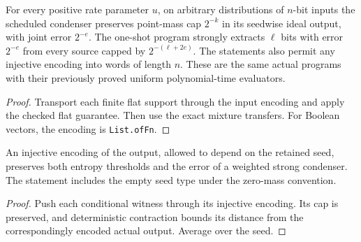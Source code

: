 \begin{theorem}
  \label{thm:lowerbounds-algebraic-weighted-programs}
  \leanok
  For every positive rate parameter $u$, on arbitrary distributions of
  $n$-bit inputs the scheduled condenser
  preserves point-mass cap $2^{-k}$ in its seedwise ideal output, with
  joint error $2^{-e}$. The one-shot program strongly extracts $\ell$ bits
  with error $2^{-e}$ from every source capped by $2^{-(\ell+2e)}$.
  The statements also permit any injective encoding into words of length
  $n$. These are the same actual programs with their previously proved
  uniform polynomial-time evaluators.
\end{theorem}
\begin{proof}
  \leanok
  Transport each finite flat support through the input encoding and apply
  the checked flat guarantee. Then use the exact mixture transfers. For
  Boolean vectors, the encoding is \texttt{List.ofFn}.
\end{proof}

\begin{theorem}
  \label{thm:lowerbounds-algebraic-condenser-output-transport}
  \leanok
  An injective encoding of the output, allowed to depend on the retained
  seed, preserves both entropy thresholds and the error of a weighted
  strong condenser. The statement includes the empty seed type under
  the zero-mass convention.
\end{theorem}
\begin{proof}
  \leanok
  Push each conditional witness through its injective encoding. Its cap
  is preserved, and deterministic contraction bounds its distance from
  the correspondingly encoded actual output. Average over the seed.
\end{proof}

